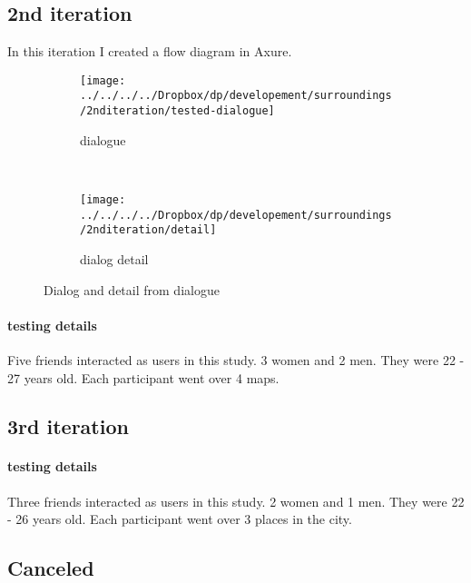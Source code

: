 			\subsection{2nd iteration}
				In this iteration I created a flow diagram in Axure\cite{axure}. 
				

			
				\begin{figure*}[ht]
					\centering
					\begin{subfigure}[t]{0.5\textwidth}
						\centering
						\texttt{[image: ../../../../Dropbox/dp/developement/surroundings/2nditeration/tested-dialogue]}
						\caption[]{dialogue}
						\label{fig:tested-dialogue}
					\end{subfigure}%
					~ 
					\begin{subfigure}[t]{0.5\textwidth}
						\centering
						\texttt{[image: ../../../../Dropbox/dp/developement/surroundings/2nditeration/detail]}
						\caption[]{dialog detail}
						\label{fig:dialog-detail}
					\end{subfigure}
					\caption{Dialog and detail from dialogue}
				\end{figure*}
		
		
		


	
				
				
				
				\paragraph{testing details}
					Five friends interacted as users in this study. 3 women and 2 men. They were 22 - 27 years old. Each participant went over 4 maps.
			\subsection{3rd iteration}
				\paragraph{testing details}
					Three friends interacted as users in this study. 2 women and 1 men. They were 22 - 26 years old. Each participant went over 3 places in the city.		
			\subsection{Canceled}

